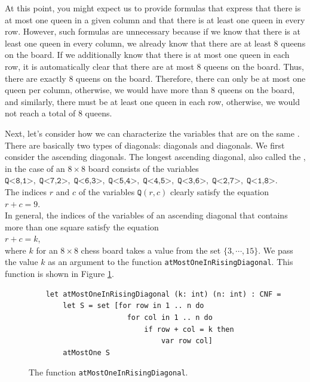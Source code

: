 At this point, you might expect us to provide formulas that express that there is at most one queen in a given column and that there is at least one queen in every row.
However, such formulas are unnecessary because if we know that there is at least one queen in every column, we already know that there are at least 8 queens on the board.
If we additionally know that there is at most one queen in each row, it is automatically clear that there are at most 8 queens on the board. Thus, there are exactly
8 queens on the board. Therefore, there can only be at most one queen per column, otherwise, we would have more than 8 queens on the board, and similarly, there must be at least one queen in each row, otherwise, we would not reach a total of 8 queens.

Next, let's consider how we can characterize the variables that are on the same .
There are basically two types of diagonals:  diagonals and  diagonals. We first consider
the ascending diagonals. The longest ascending diagonal, also called the
, in the case of an $8 \times 8$ board consists of the
variables \\[0.2cm]
\hspace*{1.3cm} 
$\texttt{Q<8,1>},\; \texttt{Q<7,2>},\; \texttt{Q<6,3>},\; \texttt{Q<5,4>},\; \texttt{Q<4,5>},\; \texttt{Q<3,6>},\; 
 \texttt{Q<2,7>},\; \texttt{Q<1,8>}$.
\\[0.2cm]
The indices $r$ and $c$ of the variables $\texttt{Q}(r,c)$ clearly satisfy
the equation \\[0.2cm]
\hspace*{1.3cm} $r + c = 9$. \\[0.2cm]
In general, the indices of the variables of an ascending diagonal that contains more than one square satisfy the
equation \\[0.2cm] 
\hspace*{1.3cm} $r + c = k$, \\[0.2cm]
where $k$ for an $8 \times 8$ chess board takes a value from the set $\{3, \cdots, 15 \}$. We pass the value $k$ as an argument to the
function \texttt{atMostOneInRisingDiagonal}. This function is shown in Figure
\ref{fig:atMostOneInUpperDiagonal}.


\begin{figure}[!ht]
  \centering
\begin{verbatim}
    let atMostOneInRisingDiagonal (k: int) (n: int) : CNF =
        let S = set [for row in 1 .. n do
                       for col in 1 .. n do
                           if row + col = k then
                               var row col]
        atMostOne S
\end{verbatim}
\vspace*{-0.3cm}
  \caption{The function \texttt{atMostOneInRisingDiagonal}.}
  \label{fig:atMostOneInUpperDiagonal}
\end{figure}

